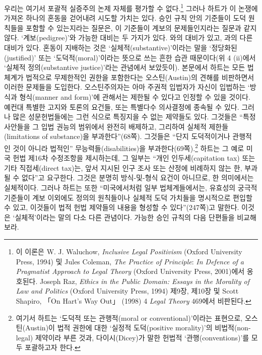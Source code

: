 우리는 여기서 포괄적 실증주의 논제 자체를 평가할 수 없다.\footnote{이
  이론은 W. J. Waluchow, \emph{Inclusive Legal Positivism} (Oxford
  University Press, 1994) 및 Jules Coleman, \emph{The Practice of
  Principle}: \emph{In Defence of a Pragmatist Approach to Legal Theory}
  (Oxford University Press, 2001)에서 옹호된다. Joseph Raz, \emph{Ethics
  in the Public Domain: Essays in the Morality of Law and Politics}
  (Oxford University Press, 1994) 제9장, 제10장 및 Scott Shapiro, 「On
  Hart's Way Out」 (1998) 4 \emph{Legal Theory} 469에서 비판된다.}
그러나 하트가 이 논쟁에 가져온 하나의 혼동을 걷어내려 시도할 가치는
있다. 승인 규칙 안의 기준들이 도덕 원칙들을 포함할 수 있는지라는 질문은,
이 기준들이 계보의 문제들인지라는 질문과 같지 않다. ‘계보(pedigree)’와
가능한 대비는 두 가지가 있다. 와의 대비가 있고,
과의 다른 대비가 있다. 혼동이 지배하는 것은
‘실체적(substantive)’이라는 말을 ‘정당화된(justified)’ 또는
‘도덕적(moral)’이라는 뜻으로 쓰는 흔한 습관 때문이다(위 4 (ii)에서
‘실체적 정의(substantive justice)’라는 관념에서 보았듯이). 본문에서
하트는 모든 법체계가 법적으로 무제한적인 권한을 포함한다는
오스틴(Austin)의 견해를 비판하면서 이러한 문제들을 도입한다.
오스틴주의자는 아마 주권적 입법자가 자신이 입법하는 ‘방식과 형식(manner
and form)’에 관해서는 제한될 수 있다고 인정할 수 있을 것이다. 예컨대
특별한 고지와 토론의 요건들, 또는 특별다수 의사결정에 종속될 수 있다.
그러나 많은 성문헌법들에는 그런 식으로 특징지을 수 없는 제약들도 있다.
그것들은 “특정 사안들을 그 입법 권능의 범위에서 완전히 배제하고,
그리하여 실체적 제한들(limitations of substance)을 부과한다”(68쪽).
그것들은 “단지 도덕적이거나 관행적인 것이 아니라 법적인”
무능력들(disabilities)을 부과한다(69쪽).\footnote{여기서 하트는 ‘도덕적
  또는 관행적(moral or conventional)’이라는 표현으로, 오스틴(Austin)이
  법적 권한에 대한 ‘실정적 도덕(positive morality)’의 비법적(non-legal)
  제약이라 부른 것과, 다이시(Dicey)가 말한 헌법적 ‘관행(conventions)’를
  모두 포괄하고자 한다.} 하트는 그 예로 미국 헌법 제16차 수정조항을
제시하는데, 그 일부는 “개인 인두세(capitation tax) 또는 기타
직접세(direct tax)는, 앞서 지시된 인구 조사 또는 산정에 비례하지 않는
한, 부과될 수 없다”고 요구한다. 그것은 분명히 방식-및-형식 요건이
아니므로, 한 의미에서는 실체적이다. 그러나 하트는 또한 “미국에서처럼
일부 법체계들에서는, 유효성의 궁극적 기준들이 계보 이외에도 정의의
원칙들이나 실체적 도덕 가치들을 명시적으로 편입할 수 있고, 이것들이 법적
헌법 제약들의 내용을 형성할 수 있다”(247쪽)고 말한다. 이것은
‘실체적’이라는 말의 다소 다른 관념이다. 가능한 승인 규칙의 다음 단편들을
비교해 보라.

